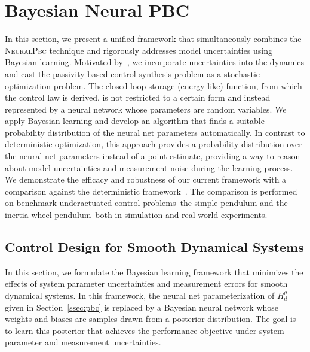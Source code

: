 
\section{Bayesian Neural PBC}

In this section, we present a unified framework that simultaneously combines
the \textsc{NeuralPbc} technique and rigorously addresses model uncertainties using
Bayesian learning.
%
Motivated by~\cite{sirichotiyakul2020data}, we incorporate uncertainties into
the dynamics and cast the passivity-based control synthesis problem as a
stochastic optimization problem.
%
The closed-loop storage (energy-like) function, from which the control law is
derived, is not restricted to a certain form and instead represented by a neural
network whose parameters are random variables.
%
%
We apply Bayesian learning and develop an algorithm that finds a suitable
probability distribution of the neural net parameters automatically.
%
In contrast to deterministic optimization, this approach provides a probability
distribution over the neural net parameters instead of a point estimate,
providing a way to reason about model uncertainties and measurement noise during
the learning process.
%
We demonstrate the efficacy and robustness of our current framework with a
comparison against the deterministic framework~\cite{sirichotiyakul2020data}.
The comparison is performed on benchmark underactuated control problems--the
simple pendulum and the inertia wheel pendulum--both in simulation and
real-world experiments. 
%

\subsection{Control Design for Smooth Dynamical Systems}
\label{ssec:pbc_smooth_dynamics}

In this section, we formulate the Bayesian learning framework that minimizes
the effects of system parameter uncertainties and measurement errors for smooth dynamical systems. 
%
In this framework, the neural net parameterization of $H^\theta_d$ given in
Section~\ref{ssec:pbc} is replaced by a Bayesian neural
network whose weights and biases are samples drawn from a posterior distribution.
%
The goal is to learn this posterior that achieves the performance objective under system parameter and measurement uncertainties. 
%


